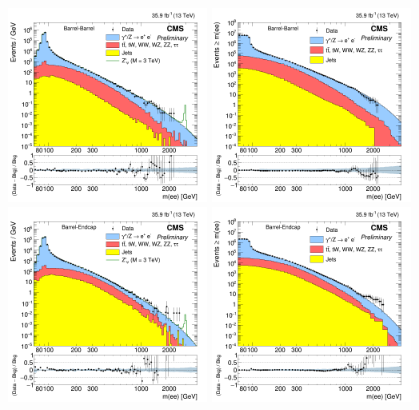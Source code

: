 \begin{figure}[ht]
  \begin{center}
    \includegraphics[width=0.47\textwidth]{figures/Zprime/2016/mass/massHistEBEB}
    \includegraphics[width=0.47\textwidth]{figures/Zprime/2016/mass/cMassHistEBEB}
    \includegraphics[width=0.47\textwidth]{figures/Zprime/2016/mass/massHistEBEE}
    \includegraphics[width=0.47\textwidth]{figures/Zprime/2016/mass/cMassHistEBEE}

\end{center}
\end{figure}
